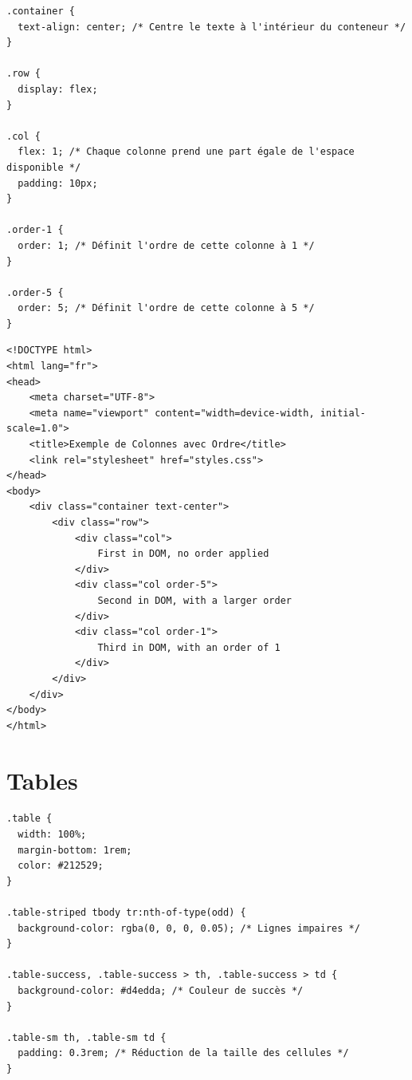\documentclass{report}
\begin{document}
\begin{multicols*}{2}
\begin{lstlisting}[style=CSSDraculaLight]
.container {
  text-align: center; /* Centre le texte à l'intérieur du conteneur */
}

.row {
  display: flex;
}

.col {
  flex: 1; /* Chaque colonne prend une part égale de l'espace disponible */
  padding: 10px;
}

.order-1 {
  order: 1; /* Définit l'ordre de cette colonne à 1 */
}

.order-5 {
  order: 5; /* Définit l'ordre de cette colonne à 5 */
}
\end{lstlisting}

\begin{lstlisting}[style=HTMLDraculaDark]
<!DOCTYPE html>
<html lang="fr">
<head>
    <meta charset="UTF-8">
    <meta name="viewport" content="width=device-width, initial-scale=1.0">
    <title>Exemple de Colonnes avec Ordre</title>
    <link rel="stylesheet" href="styles.css">
</head>
<body>
    <div class="container text-center">
        <div class="row">
            <div class="col">
                First in DOM, no order applied
            </div>
            <div class="col order-5">
                Second in DOM, with a larger order
            </div>
            <div class="col order-1">
                Third in DOM, with an order of 1
            </div>
        </div>
    </div>
</body>
</html>
\end{lstlisting}



\section*{Tables}

\begin{lstlisting}[style=CSSDraculaLight]
.table {
  width: 100%;
  margin-bottom: 1rem;
  color: #212529;
}

.table-striped tbody tr:nth-of-type(odd) {
  background-color: rgba(0, 0, 0, 0.05); /* Lignes impaires */
}

.table-success, .table-success > th, .table-success > td {
  background-color: #d4edda; /* Couleur de succès */
}

.table-sm th, .table-sm td {
  padding: 0.3rem; /* Réduction de la taille des cellules */
}
\end{lstlisting}


\end{multicols*}
\end{document}

